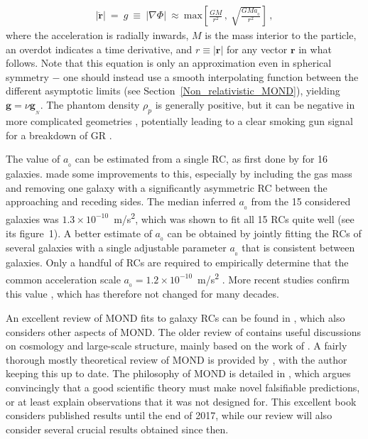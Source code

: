 \documentclass[fleqn,usenatbib,useAMS,onecolumn]{mnras} %
\begin{document}
\begin{eqnarray}
	\left| \ddot{\bm{r}} \right| ~=~ g ~\equiv~ \left| \nabla \Phi \right| ~\approx~ \mathrm{max} \left[ \frac{GM}{r^2}\, , ~\sqrt{\frac{GMa_{_0}}{r^2}} \right] \, ,
	\label{Deep_MOND_limit}
\end{eqnarray}
where the acceleration is radially inwards, $M$ is the mass interior to the particle, an overdot indicates a time derivative, and $r \equiv \left| \bm{r} \right|$ for any vector $\bm{r}$ in what follows. Note that this equation is only an approximation even in spherical symmetry $-$ one should instead use a smooth interpolating function between the different asymptotic limits (see Section~\ref{Non_relativistic_MOND}), yielding $\bm{g} = \nu \bm{g}_{_N}$. The phantom density $\rho_p$ is generally positive, but it can be negative in more complicated geometries \citep{Milgrom_1986_negative, Banik_2018_EFE}, potentially leading to a clear smoking gun signal for a breakdown of GR \citep{Oria_2021}.

The value of $a_{_0}$ can be estimated from a single RC, as first done by \citet{Kent_1987} for 16 galaxies. \citet{Milgrom_1988_a0} made some improvements to this, especially by including the gas mass and removing one galaxy with a significantly asymmetric RC between the approaching and receding sides. The median inferred $a_{_0}$ from the 15 considered galaxies was $1.3 \times 10^{-10}$~m/s\textsuperscript{2}, which was shown to fit all 15 RCs quite well (see its figure~1). A better estimate of $a_{_0}$ can be obtained by jointly fitting the RCs of several galaxies with a single adjustable parameter $a_{_0}$ that is consistent between galaxies. Only a handful of RCs are required to empirically determine that the common acceleration scale $a_{_0} = 1.2 \times 10^{-10}$~m/s\textsuperscript{2} \citep{Begeman_1991}. More recent studies confirm this value \citep{Gentile_2011, McGaugh_Lelli_2016}, which has therefore not changed for many decades.

An excellent review of MOND fits to galaxy RCs can be found in \citet{Famaey_McGaugh_2012}, which also considers other aspects of MOND. The older review of \citet{Sanders_2002} contains useful discussions on cosmology and large-scale structure, mainly based on the work of \citet{Sanders_2001}. A fairly thorough mostly theoretical review of MOND is provided by \citet{Milgrom_2014_Scholarpedia}, with the author keeping this up to date. The philosophy of MOND is detailed in \citet{Merritt_2020}, which argues convincingly that a good scientific theory must make novel falsifiable predictions, or at least explain observations that it was not designed for. This excellent book considers published results until the end of 2017, while our review will also consider several crucial results obtained since then.
\end{document}
